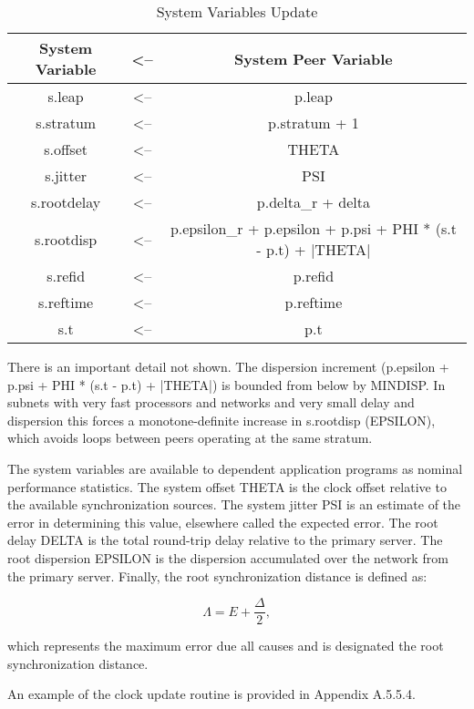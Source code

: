 \begin{table}[htb]
\center
\begin{tabular}{c | c | c}
System Variable & <-- & System Peer Variable \\
\hline
\hline
s.leap      & <-- & p.leap                    \\
s.stratum   & <-- & p.stratum + 1             \\
s.offset    & <-- & THETA                     \\
s.jitter    & <-- & PSI                       \\
s.rootdelay & <-- & p.delta\_r + delta         \\
s.rootdisp  & <-- & p.epsilon\_r + p.epsilon + p.psi + PHI * (s.t - p.t) + |THETA|  \\
s.refid     & <-- & p.refid                   \\
s.reftime   & <-- & p.reftime                 \\
s.t         & <-- & p.t                       \\
\hline
\end{tabular}
\label{system_variables_update}
\caption{System Variables Update}
\end{table}

There is an important detail not shown.  The dispersion increment
(p.epsilon + p.psi + PHI * (s.t - p.t) + |THETA|) is bounded from
below by MINDISP.  In subnets with very fast processors and networks
and very small delay and dispersion this forces a monotone-definite
increase in s.rootdisp (EPSILON), which avoids loops between peers
operating at the same stratum.

The system variables are available to dependent application programs
as nominal performance statistics.  The system offset THETA is the
clock offset relative to the available synchronization sources.  The
system jitter PSI is an estimate of the error in determining this
value, elsewhere called the expected error.  The root delay DELTA is
the total round-trip delay relative to the primary server.  The root
dispersion EPSILON is the dispersion accumulated over the network
from the primary server.  Finally, the root synchronization distance
is defined as:

$$
\Lambda = E + \frac{\Delta}{2},
$$

which represents the maximum error due all causes and is designated
the root synchronization distance.

An example of the clock update routine is provided in
Appendix A.5.5.4.

